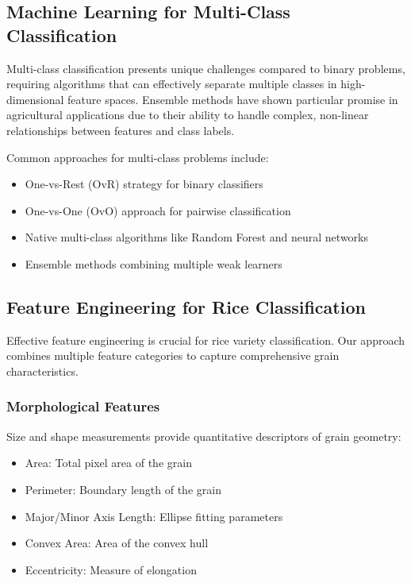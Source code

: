 \documentclass[conference]{IEEEtran}
\begin{document}
\subsection{Machine Learning for Multi-Class Classification}

Multi-class classification presents unique challenges compared to binary problems, requiring algorithms that can effectively separate multiple classes in high-dimensional feature spaces. Ensemble methods have shown particular promise in agricultural applications due to their ability to handle complex, non-linear relationships between features and class labels.

Common approaches for multi-class problems include:
\begin{itemize}
    \item One-vs-Rest (OvR) strategy for binary classifiers
    \item One-vs-One (OvO) approach for pairwise classification
    \item Native multi-class algorithms like Random Forest and neural networks
    \item Ensemble methods combining multiple weak learners
\end{itemize}

\subsection{Feature Engineering for Rice Classification}

Effective feature engineering is crucial for rice variety classification. Our approach combines multiple feature categories to capture comprehensive grain characteristics.

\subsubsection{Morphological Features}
Size and shape measurements provide quantitative descriptors of grain geometry:
\begin{itemize}
    \item Area: Total pixel area of the grain
    \item Perimeter: Boundary length of the grain
    \item Major/Minor Axis Length: Ellipse fitting parameters
    \item Convex Area: Area of the convex hull
    \item Eccentricity: Measure of elongation
\end{itemize}
\end{document}
